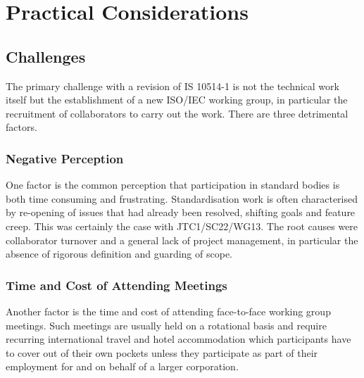 \documentclass[10pt,a4paper,leqno,fleqn]{article}
\begin{document}
\section{Practical Considerations}

\subsection{Challenges}
The primary challenge with a revision of IS 10514-1 is not the technical work
itself but the establishment of a new ISO/IEC working group, in particular the
recruitment of collaborators to carry out the work. There are three detrimental
factors.

\subsubsection{Negative Perception}
One factor is the common perception that participation in standard bodies is
both time consuming and frustrating. Standardisation work is often characterised
by re-opening of issues that had already been resolved, shifting goals and feature
creep. This was certainly the case with JTC1/SC22/WG13. The root causes were
collaborator turnover and a general lack of project management, in particular the
absence of rigorous definition and guarding of scope.

\subsubsection{Time and Cost of Attending Meetings}
Another factor is the time and cost of attending face-to-face working group
meetings. Such meetings are usually held on a rotational basis and require
recurring international travel and hotel accommodation which participants
have to cover out of their own pockets unless they participate as part of their
employment for and on behalf of a larger corporation.
\end{document}
